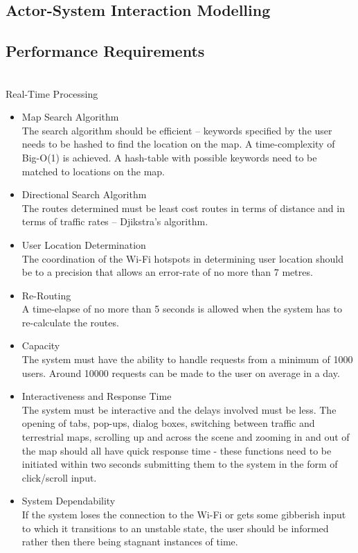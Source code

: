 \documentclass[runningheads,a4paper]{article}
\begin{document}
\subsection{Actor-System Interaction Modelling}

\subsection{Performance Requirements}


\noindent \\ Real-Time Processing

\begin{itemize}
\item Map Search Algorithm\\The search algorithm should be efficient – keywords specified by the user needs to be hashed to find the location on the map. A time-complexity of Big-O(1) is achieved. A hash-table with possible keywords need to be matched to locations on the map.

\item Directional Search Algorithm\\The routes determined must be least cost routes in terms of distance and in terms of traffic rates – Djikstra’s algorithm.

\item User Location Determination\\The coordination of the Wi-Fi hotspots in determining user location should be to a precision that allows an error-rate of no more than 7 metres.

\item Re-Routing\\A time-elapse of no more than 5 seconds is allowed when the system has to re-calculate the routes.

\item Capacity\\The system must have the ability to handle requests from a minimum of 1000 users. Around 10000 requests can be made to the user on average in a day.

\item Interactiveness and Response Time\\The system must be interactive and the delays involved must be less. The opening of tabs, pop-ups, dialog boxes, switching between traffic and terrestrial maps, scrolling up and across the scene and zooming in and out of the map should all have quick response time - these functions need to be initiated within two seconds submitting them to the system in the form of click/scroll input.

\item System Dependability\\If the system loses the connection to the Wi-Fi or gets some gibberish input to which it transitions to an unstable state, the user should be informed rather then there being stagnant instances of time.

\end{itemize}
\end{document}
